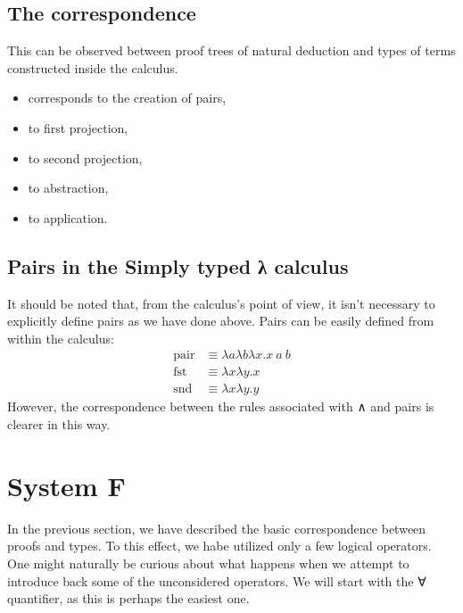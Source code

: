 \documentclass[12pt]{article}
\begin{document}
\subsection{The correspondence}
This can be observed between proof trees of natural deduction and types of terms constructed inside the calculus.
\begin{itemize}
    \item {} corresponds to the creation of pairs,
    \item {} to first projection,
    \item {} to second projection,
    \item {} to abstraction,
    \item {} to application.
\end{itemize}
\subsection{Pairs in the Simply typed λ calculus}
It should be noted that, from the calculus's point of view, it isn't necessary to explicitly define pairs as we have done above. Pairs can be easily defined from within the calculus:
\begin{align*}
\mathrm{pair} &≡ λaλbλx.x \ a \ b\\
\mathrm{fst} &≡ λxλy.x\\
\mathrm{snd} &≡ λxλy.y
\end{align*}
However, the correspondence between the rules associated with ∧ and pairs is clearer in this way.

\section{System F}
In the previous section, we have described the basic correspondence between proofs and types. To this effect, we habe utilized only a few logical operators. One might naturally be curious about what happens when we attempt to introduce back some of the unconsidered operators. We will start with the ∀ quantifier, as this is perhaps the easiest one.
\paragraph{}
\end{document}
